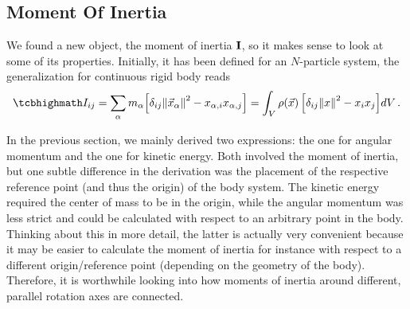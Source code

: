 \documentclass[../class_mech_main.tex]{subfiles}
\begin{document}
		\subsection{Moment Of Inertia}
We found a new object, the moment of inertia $\mathbf{I}$, so it makes sense to look at some of its properties. Initially, it has been defined for an $N$-particle system, the generalization for continuous rigid body reads
\begin{equation}
	\eqbox{
		I_{ij}
		= \sum_\alpha m_\alpha \qty[\delta_{ij} \norm{\vec{x}_{\alpha}}^2 - x_{\alpha, i} x_{\alpha, j}]
		= \int_V \rho(\vec{x}) \, \qty[\delta_{ij} \norm{x}^2 - x_i x_j] dV
	} \, .
\end{equation}



In the previous section, we mainly derived two expressions: the one for angular momentum and the one for kinetic energy. Both involved the moment of inertia, but one subtle difference in the derivation was the placement of the respective reference point (and thus the origin) of the body system. The kinetic energy required the center of mass to be in the origin, while the angular momentum was less strict and could be calculated with respect to an arbitrary point in the body. Thinking about this in more detail, the latter is actually very convenient because it may be easier to calculate the moment of inertia for instance with respect to a different origin/reference point (depending on the geometry of the body). Therefore, it is worthwhile looking into how moments of inertia around different, parallel rotation axes are connected.
\end{document}
